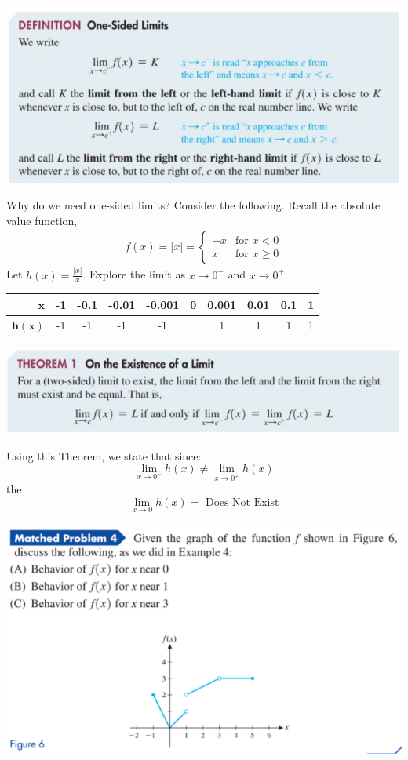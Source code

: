 \documentclass[14pt]{extarticle}
\begin{document}
\cleardoublepage
\begin{center}
	\includegraphics[width=0.9\linewidth]{9-1-2a}
\end{center}
Why do we need one-sided limits? Consider the following. Recall the absolute value function,
\begin{align*}
	f(x) = \vert x \vert = \begin{cases}
		-x  & \text{for } x < 0 \\
		x & \text{for } x \geq 0
	\end{cases}
\end{align*}
Let $h(x)=\frac{\vert x \vert}{x}$. Explore the limit as $x\to 0^-$ and $x\to 0^+$.
\begin{center}
	\begin{tabular}{|r|c|c|c|c|c|c|c|c|c|}
		\hline
		$\mathbf{x}$ & -1 & -0.1 & -0.01 & -0.001 & 0 & 0.001 & 0.01 & 0.1 & 1 \\
		\hline
		$\mathbf{h(x)}$ & -1 & -1 & -1 & -1 & \hspace{2cm} & 1 & 1 & 1 & 1 \\
		\hline
	\end{tabular}
\end{center}
\begin{center}
	\includegraphics[width=0.9\linewidth]{9-1-2b}
\end{center}
Using this Theorem, we state that since:
$$ \lim_{x\to 0^-} h(x) \neq \lim_{x\to 0^+} h(x)  $$
the $$\lim_{x\to 0}h(x)= \text{ Does Not Exist}$$

\begin{center}
	\includegraphics[width=0.9\linewidth]{9-1-3}
\end{center}
\end{document}
